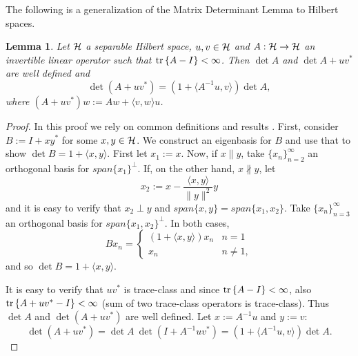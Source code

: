 \documentclass{article}
\newtheorem{lemma}{Lemma}
\begin{document}
The following is a generalization of the Matrix Determinant Lemma to
Hilbert spaces.
\begin{lemma}%
  Let $\mathcal{H}$ a separable Hilbert space, $u,v\in \mathcal{H}$ and $A: \mathcal{H} \to
  \mathcal{H}$ an invertible linear operator such that $\textup{tr}\left \{A-I \right \} <
  \infty$. Then $\det A$ and $\det A + uv^*$ are well defined and
  \begin{equation*}
    \det (A + uv^*) = (1 + \langle A^{-1} u, v \rangle ) \det A,
  \end{equation*}
  where $(A + uv^*)w := Aw + \langle v,w \rangle u$.
\end{lemma}
\begin{proof}
  In this proof we rely on common definitions and results
  \cite{simon1977}. First, consider $B := I + xy^*$ for some $x,y \in
  \mathcal{H}$. We construct an eigenbasis for $B$ and use that to show $\det
  B = 1 + \langle x, y \rangle$. First let $x_1 := x$.  Now, if $x
  \parallel y$, take $\{x_n \}_{n=2}^{\infty}$ an orthogonal basis for
  $span\{x_1\} ^{\perp}$. If, on the other hand, $x \not \parallel y$,
  let
  \begin{equation*}
    x_2 := x - \frac{ \langle x, y\rangle}{\|y\|^2}y
  \end{equation*}
  and it is easy to verify that $x_2 \perp y$ and $span \{x,y\} = span
  \{x_1,x_2\}$. Take $\{x_n \}_{n=3}^{\infty}$ an orthogonal basis for
  $span\{x_1,x_2\} ^{\perp}$. In both cases,
  \begin{equation*}
    B x_n =
    \begin{cases}
      (1 + \langle x, y \rangle) x_n & n = 1 \\
      x_n                            & n \neq 1,
    \end{cases}
  \end{equation*}
  and so $\det B = 1 + \langle x, y \rangle$.
  
  It is easy to verify that $uv^*$ is trace-class and since $\textup{tr}\left \{A-I \right \}
  < \infty$, also $\textup{tr}\left \{A + uv^* - I \right \} < \infty$ (sum of two trace-class
  operators is trace-class). Thus $\det A$ and $\det (A+uv^*)$ are
  well defined. Let $x:=A^{-1}u$ and $y := v$:
  \begin{equation*}
    \det (A + uv^*) = \det A \ \det(I+A^{-1}uv^*) =
    (1 + \langle A^{-1}u, v \rangle) \det A .
  \end{equation*}
\end{proof}


%


\end{document}
